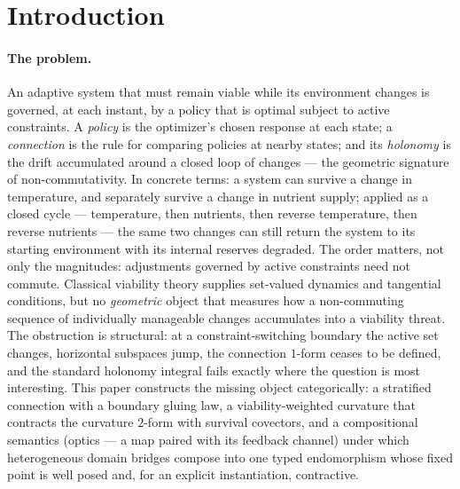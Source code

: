 \documentclass[11pt,a4paper]{article}
\theoremstyle{plain}
\theoremstyle{definition}
\theoremstyle{remark}
\begin{document}
\tableofcontents
\newpage

\section{Introduction}\label{sec:role}

\paragraph{The problem.}
An adaptive system that must remain viable while its environment
changes is governed, at each instant, by a policy that is optimal
subject to active constraints. A \emph{policy} is the optimizer's
chosen response at each state; a \emph{connection} is the rule for
comparing policies at nearby states; and its \emph{holonomy} is the
drift accumulated around a closed loop of changes --- the geometric
signature of non-commutativity. In concrete terms: a system can
survive a change in temperature, and separately survive a change in
nutrient supply; applied as a closed cycle --- temperature, then
nutrients, then reverse temperature, then reverse nutrients --- the
same two changes can still return the system to its starting
environment with its internal reserves degraded. The order matters,
not only the magnitudes: adjustments governed by active constraints
need not commute. Classical viability theory supplies
set-valued dynamics and tangential conditions, but no
\emph{geometric} object that measures how a non-commuting sequence
of individually manageable changes accumulates into a viability
threat. The obstruction is structural: at a constraint-switching
boundary the active set changes, horizontal subspaces jump, the
connection $1$-form ceases to be defined, and the standard holonomy
integral fails exactly where the question is most interesting. This
paper constructs the missing object categorically: a stratified
connection with a boundary gluing law, a viability-weighted
curvature that contracts the curvature $2$-form with survival
covectors, and a compositional semantics (optics --- a map paired
with its feedback channel) under which
heterogeneous domain bridges compose into one typed endomorphism
whose fixed point is well posed and, for an explicit
instantiation, contractive.
\end{document}

